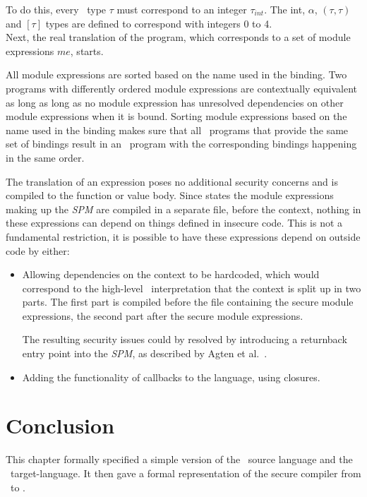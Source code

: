 To do this, every \MiniML\ type $\tau$ must correspond to an integer $\tau_{int}$.
The int, $\alpha$, $(\tau,\tau)$ and $[\tau]$ types are defined to correspond with integers 0 to 4.
\\[0.5em]
Next, the real translation of the program, which corresponds to a set of module expressions $me$, starts.

All module expressions are sorted based on the name used in the binding.
Two programs with differently ordered module expressions  are contextually equivalent as long as long as no module expression  has unresolved dependencies on other module expressions when it is bound.
Sorting module expressions based on the name used in the binding makes sure that all \MiniML\ programs that provide the same set of bindings result in an \LLVMIR\ program with the corresponding bindings happening in the same order.

\label{sec:formalization}



The translation of an expression poses no additional security concerns and is compiled to the function or value body.
Since  states the module expressions making up the \emph{SPM} are compiled in a separate file, before the context, nothing in these expressions can depend on things defined in insecure code.
This is not a fundamental restriction, it is possible to have these expressions depend on outside code by either:
\begin{itemize}
\item Allowing dependencies on the context to be hardcoded, which would correspond to the high-level \MiniML\ interpretation that the context is split up in two parts.
The first part is compiled before the file containing the secure module expressions, the second part after the secure module expressions.

The resulting security issues could by resolved by introducing a returnback entry point into the \emph{SPM}, as described by Agten et al.~\cite{Agten:2012:SCM:2354412.2355247}.
\item Adding the functionality of callbacks to the language, using closures.
\end{itemize}

\section{Conclusion}
This chapter formally specified a simple version of the \MiniML\ source language and the \LLVMIR\ target-language.
It then gave a formal representation of the secure compiler from \MiniML\ to \LLVMIR.

